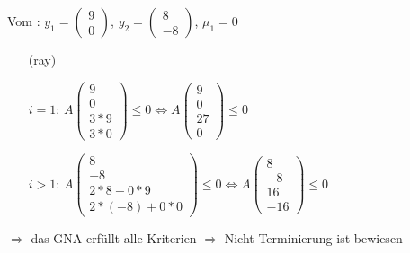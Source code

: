 \begin{frame}
	\begin{example}
		Vom \solver: $y_1=\begin{pmatrix} 9 \\ 0 \end{pmatrix}$, $y_2=\begin{pmatrix} 8 \\ -8 \end{pmatrix}$, $\mu_1=0$\newline
		\begin{itemize}
			\setlength{\itemindent}{0.5cm}
			\item[(ray)]
			\item[$i=1$:]  $A\begin{pmatrix} 9 \\ 0 \\ 3*9 \\ 3*0 \end{pmatrix} \le 0 \Leftrightarrow A\begin{pmatrix} 9 \\ 0 \\ 27 \\ 0 \end{pmatrix} \le 0$ \checkmark
			\item[$i>1$:] $A\begin{pmatrix} 8 \\ -8 \\ 2*8+0*9 \\ 2*(-8)+0*0 \end{pmatrix} \le 0 \Leftrightarrow A\begin{pmatrix} 8 \\ -8 \\ 16 \\ -16 \end{pmatrix} \le 0$ \checkmark
		\end{itemize}
		$\Rightarrow$ das GNA erf\"ullt alle Kriterien $\Rightarrow$ Nicht-Terminierung ist bewiesen
	\end{example}
\end{frame}






